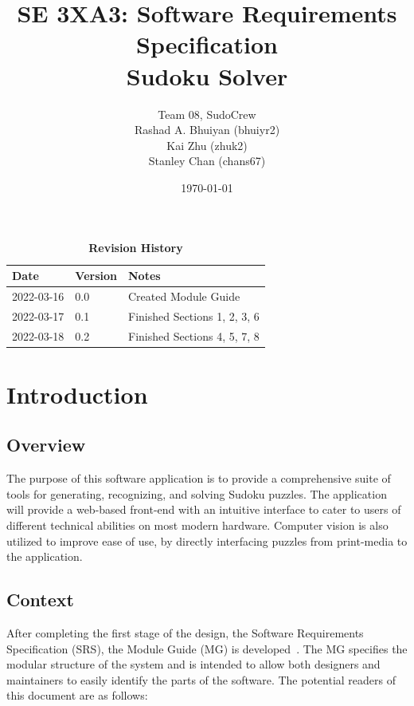 \documentclass[12pt, titlepage]{article}
\title{SE 3XA3: Software Requirements Specification\\Sudoku Solver}
\author{Team 08, SudoCrew
		\\ Rashad A. Bhuiyan (bhuiyr2)
		\\ Kai Zhu (zhuk2)
		\\ Stanley Chan (chans67)
}
\date{\today}
\begin{document}
\maketitle

\tableofcontents
\listoftables
\listoffigures

\newpage

\begin{table}[h]
\caption{\bf Revision History}
\begin{tabularx}{\textwidth}{p{3cm}p{2cm}X}
\toprule {\bf Date} & {\bf Version} & {\bf Notes}\\
\midrule
2022-03-16 & 0.0 & Created Module Guide\\
2022-03-17 & 0.1 & Finished Sections 1, 2, 3, 6\\
2022-03-18 & 0.2 & Finished Sections 4, 5, 7, 8\\
\bottomrule
\end{tabularx}
\end{table}

\newpage


\section{Introduction}

\subsection{Overview}
The purpose of this software application is to provide a comprehensive suite of tools for generating, recognizing, and solving Sudoku puzzles. The application will provide a web-based front-end with an intuitive interface to cater to users of different technical abilities on most modern hardware. Computer vision is also utilized to improve ease of use, by directly interfacing puzzles from print-media to the application.

\subsection{Context}
After completing the first stage of the design, the Software Requirements
Specification (SRS), the Module Guide (MG) is developed~\citep{ParnasEtAl1984}. The MG
specifies the modular structure of the system and is intended to allow both
designers and maintainers to easily identify the parts of the software.  The
potential readers of this document are as follows:
\end{document}

